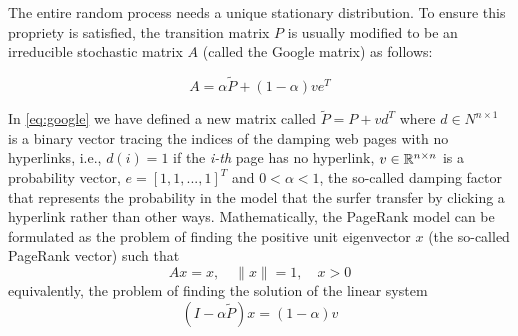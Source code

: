 \noindent The entire random process needs a unique stationary distribution. To ensure this propriety is satisfied, the transition matrix $P$ is usually modified to be an irreducible stochastic matrix $A$ (called the Google matrix) as follows:


\begin{equation}\label{eq:google}
    A = \alpha \tilde P + (1 - \alpha)v e^T
\end{equation}

\noindent In \ref{eq:google} we have defined a new matrix called $\tilde P = P + vd^T$ where $d \in N^{n \times 1}$ is a binary vector tracing the indices of the damping web pages with no hyperlinks, i.e., $d(i) = 1$ if the \emph{i-th} page has no hyperlink, $v \in \mathbb{R}^{n \times n}$ is a probability vector, $e = [1, 1, ... ,1]^T$ and $0<\alpha<1$, the so-called damping factor that represents the probability in the model that the surfer transfer by clicking a hyperlink rather than other ways. Mathematically, the PageRank model can be formulated as the problem of finding the positive unit eigenvector $x$ (the so-called PageRank vector) such that
\begin{equation}\label{eq:pr}
    Ax = x, \quad \lVert x \rVert = 1, \quad x > 0
\end{equation}
equivalently, the problem of finding the solution of the linear system
\begin{equation}\label{eq:pr2}
    (I - \alpha \tilde P)x = (1 - \alpha)v
\end{equation}


